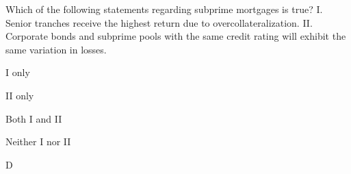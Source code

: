 \documentclass{article}
\newcounter{question} %
\begin{document}
\begin{question}
    Which of the following statements regarding subprime mortgages is true?
    I. Senior tranches receive the highest return due to overcollateralization.
    II. Corporate bonds and subprime pools with the same credit rating will exhibit the same variation in losses.
\end{question}

\begin{choices}
    \item I only
    \item II only
    \item Both I and II
    \item Neither I nor II
\end{choices}

\begin{correctanswer}
    D
\end{correctanswer}
\end{document}
